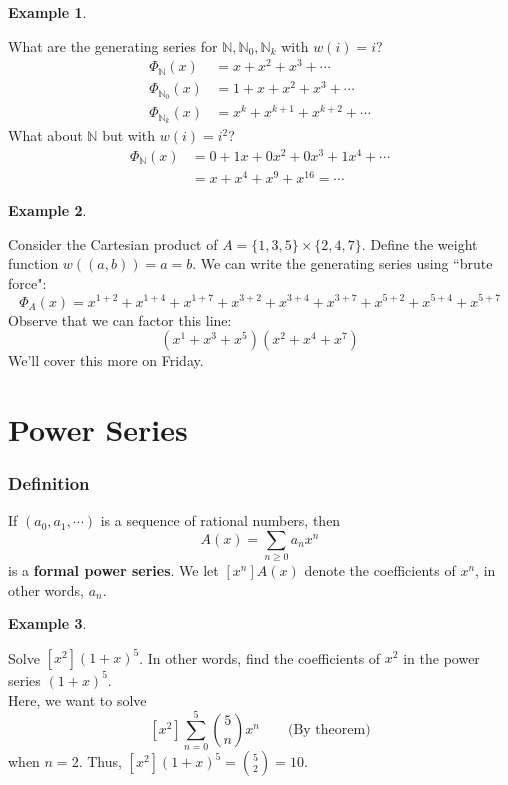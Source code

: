 \documentclass{report}
\newtheorem{ex}{Example}[section]
\begin{document}
\begin{ex}
\end{ex}
What are the generating series for $\mathbb{N}, \mathbb{N}_0, \mathbb{N}_k$ with $w(i) = i$?
\begin{align*}
\Phi_{\mathbb{N}} (x) &= x + x^2 + x^3 + \cdots \\
\Phi_{\mathbb{N}_0} (x) &= 1 + x + x^2 + x^3 + \cdots \\
\Phi_{\mathbb{N}_k} (x) &= x^k + x^{k+1} + x^{k+2} + \cdots
\end{align*}
What about $\mathbb{N}$ but with $w(i) = i^2$?
\begin{align*}
\Phi_{\mathbb{N}}(x) &= 0 + 1x + 0x^2 + 0x^3 + 1x^4 + \cdots  \\
&= x + x^4 + x^9 + x^{16} = \cdots
\end{align*}
\begin{ex}
\end{ex}
Consider the Cartesian product of $A = \{1,3,5\} \times \{2,4,7\}$. Define the weight function $w((a,b)) = a=b$. We can write the generating series using ``brute force":
$$\Phi_{A}(x) = x^{1+2} + x^{1+4} + x^{1+7} + x^{3+2} + x^{3+4} + x^{3+7} + x^{5+2} + x^{5 + 4} + x^{5+7}$$
Observe that we can factor this line:
$$(x^1 + x^3 + x^5)(x^2 + x^4 + x^7)$$
We'll cover this more on Friday.
\section{Power Series}
\subsubsection{Definition}
If $(a_0, a_1, \cdots)$ is a sequence of rational numbers, then
$$A(x) = \sum_{n \geq 0} a_nx^n$$
is a \textbf{formal power series}. We let $[x^n]A(x)$ denote the coefficients of $x^n$, in other words, $a_n$. \newpage
\begin{ex}
\end{ex}
Solve $[x^2](1+x)^5$. In other words, find the coefficients of $x^2$ in the power series $(1+x)^5$.\\Here, we want to solve
$$[x^2]\sum_{n=0}^5 {5 \choose n}x^n \qquad\text{(By theorem)}$$
when $n=2$. Thus, $[x^2](1+x)^5 = {5 \choose 2} = 10.$
\end{document}
